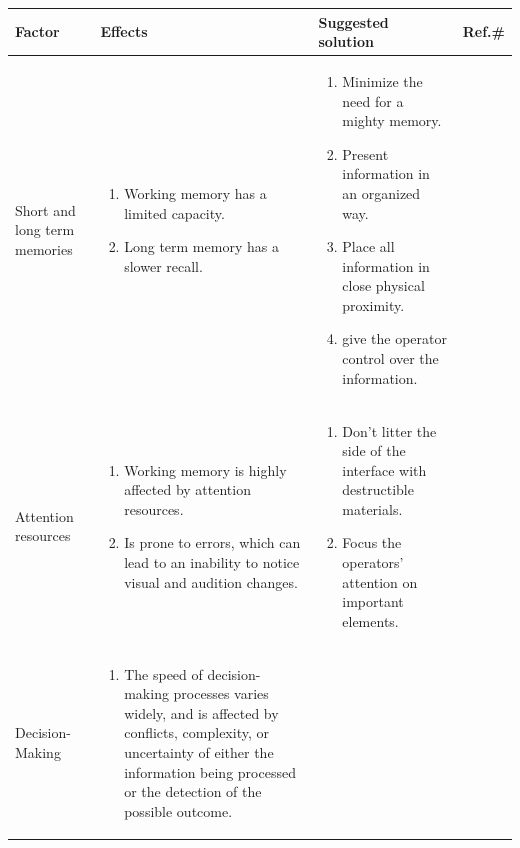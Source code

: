 \begin{longtable}{p{2.5cm} p{5cm} p{5cm} p{1cm}}
    \hline
      \textbf{Factor} & \textbf{Effects} & \textbf{Suggested solution} & \textbf{Ref.\#}\\
            \hline
            \rowcolor{lightgray} 
           Short and long term memories &
           \begin{enumerate}
                \item Working memory has a limited capacity.
                \item Long term memory has a slower recall. 
           \end{enumerate} &
           \begin{enumerate}
           \item Minimize the need for a mighty memory.
           \item Present information in an organized way.
           \item Place all information in close physical proximity.
           \item give the operator control over the information.
           \end{enumerate}
             & 
            \cite{Bowman:2004:UIT:993837}\\
        \hline
          
                Attention resources &
                \begin{enumerate}
                    \item Working memory is highly affected by attention resources.
                    \item Is prone to errors, which can lead to an inability to notice visual and audition changes.
                \end{enumerate} &
                \begin{enumerate}
                \item Don't litter the side of the interface with destructible materials.
                \item Focus the operators’ attention on important elements.
                \end{enumerate} &
                \cite{SIMONS200516} \cite{Bowman:2004:UIT:993837} \cite{PMID:11540969}\\
                
                \hline
     \rowcolor{lightgray}
       Decision-Making &
           \begin{enumerate}
           \item The speed of decision-making processes varies widely, and is affected by conflicts, complexity, or uncertainty of either the information being processed or the detection of the possible outcome.
           

\end{enumerate}
\end{longtable}
